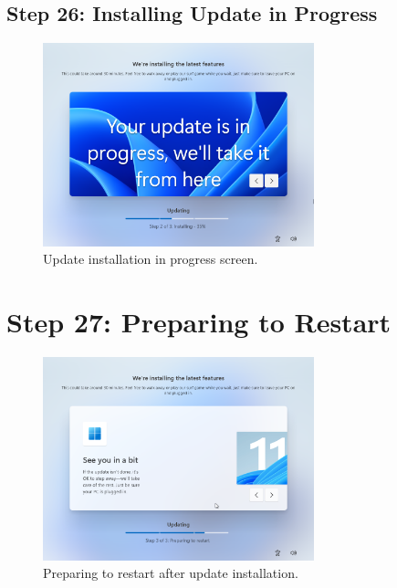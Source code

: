 \documentclass{article}
\begin{document}
\subsection{Step 26: Installing Update in Progress}
\begin{figure}[H]
    \centering
    \includegraphics[width=0.7\textwidth]{2024-09-17_15-45-07.png}
    \caption{Update installation in progress screen.}
    \label{fig:update_progress}
\end{figure}

\section{Step 27: Preparing to Restart}
\begin{figure}[H]
    \centering
    \includegraphics[width=0.7\textwidth]{2024-09-17_15-55-19.png}
    \caption{Preparing to restart after update installation.}
    \label{fig:preparing_restart}
\end{figure}
\end{document}
